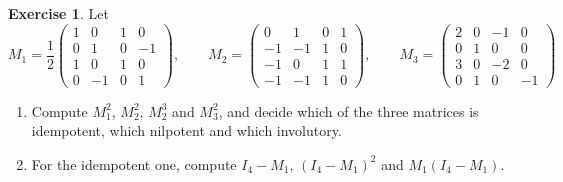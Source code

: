 \documentclass[12pt]{article}
\theoremstyle{definition}
\newtheorem{exercise}{Exercise}
\begin{document}
\begin{exercise}\label{r1-dr-special}
Let
\[
M_1=\frac12\begin{pmatrix}1&0&1&0\\0&1&0&-1\\1&0&1&0\\0&-1&0&1\end{pmatrix},\qquad
M_2=\begin{pmatrix}0&1&0&1\\-1&-1&1&0\\-1&0&1&1\\-1&-1&1&0\end{pmatrix},\qquad
M_3=\begin{pmatrix}2&0&-1&0\\0&1&0&0\\3&0&-2&0\\0&1&0&-1\end{pmatrix}
\]
\begin{enumerate}
\item Compute \(M_1^2\), \(M_2^2\), \(M_2^3\) and \(M_3^2\), and decide which of the three matrices is idempotent,
which nilpotent and which involutory.
\item For the idempotent one, compute \(I_4-M_1\), \((I_4-M_1)^2\) and \(M_1(I_4-M_1)\).
\end{enumerate}
\end{exercise}
\end{document}
